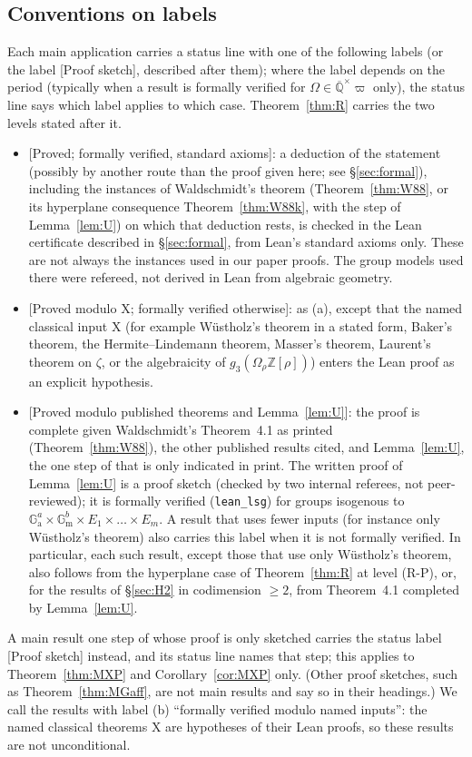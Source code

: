 \documentclass[11pt]{amsart}
\theoremstyle{definition}
\newcommand{\Qb}{\overline{\mathbb{Q}}}
\newcommand{\Z}{\mathbb{Z}}
\newcommand{\Ga}{\mathbb{G}_{\mathrm a}}
\newcommand{\Gm}{\mathbb{G}_{\mathrm m}}
\newcommand{\vp}{\varpi}
\newcommand{\lab}[1]{\textup{[#1]}}
\newif\ifformallabels \formallabelstrue
\newcommand{\LabC}{\lab{Proved modulo published theorems and Lemma~\ref{lem:U}}}
\newcommand{\LabS}{\lab{Proof sketch}}
\begin{document}
\subsection*{Conventions on labels}
Each main application carries a status line with one of the following labels (or the label \LabS, described after them);
where the label depends on the period (typically when a result is formally verified for $\Omega\in\Qb^\times\vp$ only), the
status line says which label applies to which case. Theorem~\ref{thm:R} carries the two levels stated after it.
\begin{itemize}
\ifformallabels
\item[(a)] \lab{Proved; formally verified, standard axioms}: a deduction of the statement (possibly by another route than
the proof given here; see \S\ref{sec:formal}), including the instances of Waldschmidt's theorem (Theorem~\ref{thm:W88}, or
its hyperplane consequence Theorem~\ref{thm:W88k}, with the step of Lemma~\ref{lem:U}) on which that deduction rests, is
checked in the Lean certificate described in \S\ref{sec:formal}, from Lean's standard axioms only. These are not always
the instances used in our paper proofs. The group models used there were refereed, not derived in Lean from algebraic
geometry.
\item[(b)] \lab{Proved modulo X; formally verified otherwise}: as (a), except that the named classical input X (for
example W\"ustholz's theorem in a stated form, Baker's theorem, the Hermite--Lindemann theorem, Masser's theorem,
Laurent's theorem on $\zeta$, or the algebraicity of $g_3(\Omega_\rho\Z[\rho])$) enters the Lean proof as an explicit
hypothesis.
\fi
\item[(c)] \LabC: the proof is complete given Waldschmidt's Theorem~4.1 \cite{W88} as printed (Theorem~\ref{thm:W88}),
the other published results cited, and Lemma~\ref{lem:U}, the one step of \cite[Prop.~6.1]{W88} that is only indicated in
print. The written proof of Lemma~\ref{lem:U} is a proof sketch (checked by two internal referees, not peer-reviewed); it
is formally verified (\texttt{lean\_lsg}) for groups isogenous to $\Ga^{a}\times\Gm^{b}\times E_1\times\dots\times E_m$. A
result that uses fewer inputs (for instance only W\"ustholz's theorem) also carries this label when it is not formally
verified. In particular, each such result, except those that use only W\"ustholz's theorem, also follows from the
hyperplane case of Theorem~\ref{thm:R} at level (R-P), or, for the results of \S\ref{sec:H2} in codimension $\ge2$, from
Theorem~4.1 completed by Lemma~\ref{lem:U}.
\end{itemize}
A main result one step of whose proof is only sketched carries the status label \LabS{} instead, and its status line names
that step; this applies to Theorem~\ref{thm:MXP} and Corollary~\ref{cor:MXP} only. (Other proof sketches, such as
Theorem~\ref{thm:MGaff}, are not main results and say so in their headings.)\ifformallabels{} We call the results with
label (b) ``formally verified modulo named inputs'': the named classical theorems X are hypotheses of their Lean proofs, so
these results are not unconditional.\fi
\end{document}
